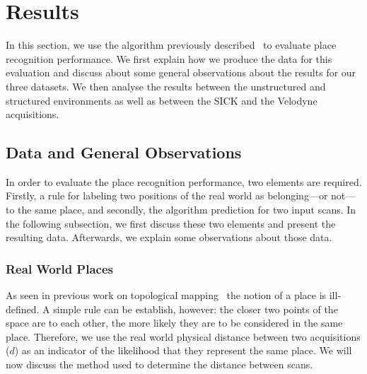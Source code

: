 \section{Results}
\label{sec:chap_slam_results}


In this section, we use the algorithm previously described~\citep{Steder2011b} to evaluate place recognition performance. We first explain how we produce the data for this evaluation and discuss about some general observations about the results for our three datasets. We then analyse the results between the unstructured and structured environments as well as between the SICK and the Velodyne acquisitions. 

\subsection{Data and General Observations}
\label{ssec:chap_slam_performance_evaluation}

In order to evaluate the place recognition performance, two elements are required. Firstly, a rule for labeling two positions of the real world as belonging---or not---to the same place, and secondly, the algorithm prediction for two input scans. In the following subsection, we first discuss these two elements and present the resulting data. Afterwards, we explain some observations about those data.


\subsubsection{Real World Places}
As seen in previous work on topological mapping~\citep{Valgren2008, Brunskill2007} the notion of a place is ill-defined. A simple rule can be establish, however: the closer two points of the space are to each other, the more likely they are to be considered in the same place. Therefore, we use the real world physical distance between two acquisitions ($d$) as an indicator of the likelihood that they represent the same place. We will now discuss the method used to determine the distance between scans. 

